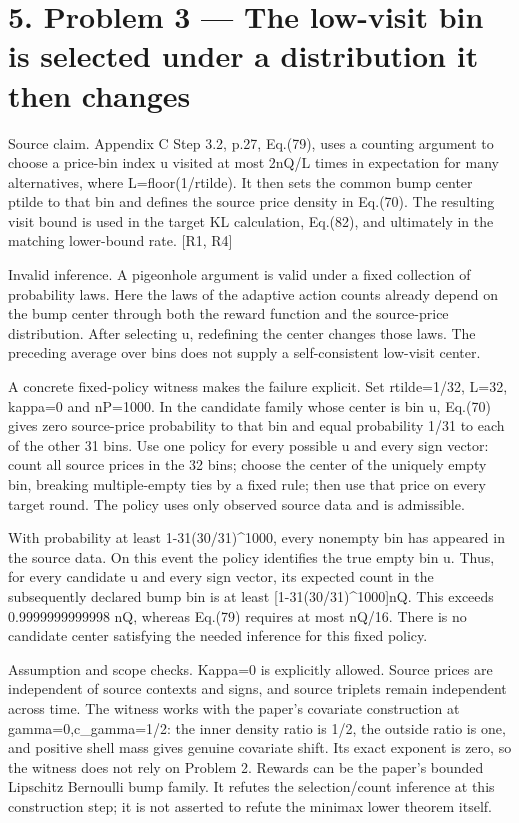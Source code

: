 \documentclass[10pt]{article}
\begin{document}
\section*{5. Problem 3 — The low-visit bin is selected under a distribution it then changes}
Source claim. Appendix C Step 3.2, p.27, Eq.(79), uses a counting argument to choose a price-bin index u visited at most 2nQ/L times in expectation for many alternatives, where L=floor(1/rtilde). It then sets the common bump center ptilde to that bin and defines the source price density in Eq.(70). The resulting visit bound is used in the target KL calculation, Eq.(82), and ultimately in the matching lower-bound rate. [R1, R4]\par
Invalid inference. A pigeonhole argument is valid under a fixed collection of probability laws. Here the laws of the adaptive action counts already depend on the bump center through both the reward function and the source-price distribution. After selecting u, redefining the center changes those laws. The preceding average over bins does not supply a self-consistent low-visit center.\par
A concrete fixed-policy witness makes the failure explicit. Set rtilde=1/32, L=32, kappa=0 and nP=1000. In the candidate family whose center is bin u, Eq.(70) gives zero source-price probability to that bin and equal probability 1/31 to each of the other 31 bins. Use one policy for every possible u and every sign vector: count all source prices in the 32 bins; choose the center of the uniquely empty bin, breaking multiple-empty ties by a fixed rule; then use that price on every target round. The policy uses only observed source data and is admissible.\par
With probability at least 1-31(30/31)\textasciicircum{}1000, every nonempty bin has appeared in the source data. On this event the policy identifies the true empty bin u. Thus, for every candidate u and every sign vector, its expected count in the subsequently declared bump bin is at least [1-31(30/31)\textasciicircum{}1000]nQ. This exceeds 0.9999999999998 nQ, whereas Eq.(79) requires at most nQ/16. There is no candidate center satisfying the needed inference for this fixed policy.\par
Assumption and scope checks. Kappa=0 is explicitly allowed. Source prices are independent of source contexts and signs, and source triplets remain independent across time. The witness works with the paper’s covariate construction at gamma=0,c\_gamma=1/2: the inner density ratio is 1/2, the outside ratio is one, and positive shell mass gives genuine covariate shift. Its exact exponent is zero, so the witness does not rely on Problem 2. Rewards can be the paper’s bounded Lipschitz Bernoulli bump family. It refutes the selection/count inference at this construction step; it is not asserted to refute the minimax lower theorem itself.\par
\end{document}
